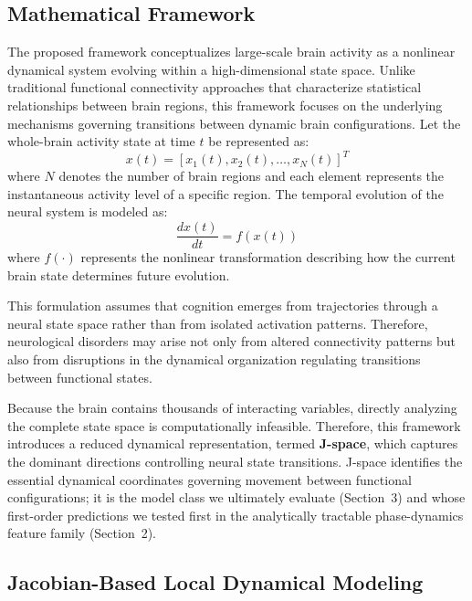 \documentclass{article}
\begin{document}
\subsection{Mathematical Framework}

The proposed framework conceptualizes large-scale brain activity as a nonlinear dynamical system evolving within a high-dimensional state space. Unlike traditional functional connectivity approaches that characterize statistical relationships between brain regions, this framework focuses on the underlying mechanisms governing transitions between dynamic brain configurations. Let the whole-brain activity state at time $t$ be represented as:
\begin{equation}
x(t)=[x_1(t),x_2(t),\ldots,x_N(t)]^T
\end{equation}
where $N$ denotes the number of brain regions and each element represents the instantaneous activity level of a specific region. The temporal evolution of the neural system is modeled as:
\begin{equation}
\frac{dx(t)}{dt}=f(x(t))
\end{equation}
where $f(\cdot)$ represents the nonlinear transformation describing how the current brain state determines future evolution.

This formulation assumes that cognition emerges from trajectories through a neural state space rather than from isolated activation patterns. Therefore, neurological disorders may arise not only from altered connectivity patterns but also from disruptions in the dynamical organization regulating transitions between functional states.

Because the brain contains thousands of interacting variables, directly analyzing the complete state space is computationally infeasible. Therefore, this framework introduces a reduced dynamical representation, termed \textbf{J-space}, which captures the dominant directions controlling neural state transitions. J-space identifies the essential dynamical coordinates governing movement between functional configurations; it is the model class we ultimately evaluate (Section~3) and whose first-order predictions we tested first in the analytically tractable phase-dynamics feature family (Section~2).

\subsection{Jacobian-Based Local Dynamical Modeling}
\end{document}
